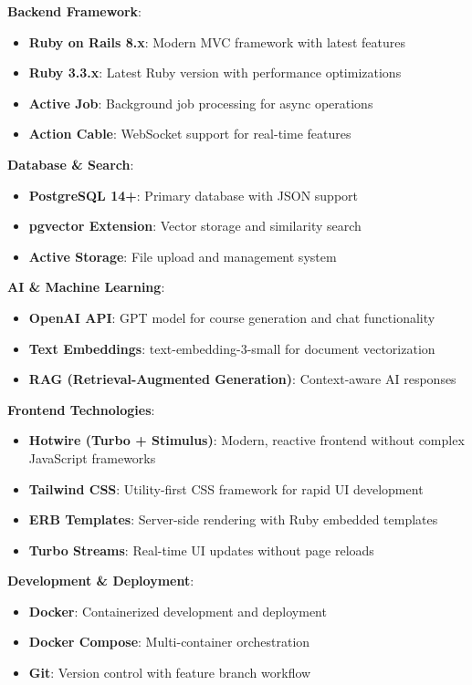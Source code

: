\documentclass[a4paper,11pt]{article}
\begin{document}
\textbf{Backend Framework}:
\begin{itemize}
    \item \textbf{Ruby on Rails 8.x}: Modern MVC framework with latest features
    \item \textbf{Ruby 3.3.x}: Latest Ruby version with performance optimizations
    \item \textbf{Active Job}: Background job processing for async operations
    \item \textbf{Action Cable}: WebSocket support for real-time features
\end{itemize}

\textbf{Database \& Search}:
\begin{itemize}
    \item \textbf{PostgreSQL 14+}: Primary database with JSON support
    \item \textbf{pgvector Extension}: Vector storage and similarity search
    \item \textbf{Active Storage}: File upload and management system
\end{itemize}

\textbf{AI \& Machine Learning}:
\begin{itemize}
    \item \textbf{OpenAI API}: GPT model for course generation and chat functionality
    \item \textbf{Text Embeddings}: text-embedding-3-small for document vectorization
    \item \textbf{RAG (Retrieval-Augmented Generation)}: Context-aware AI responses
\end{itemize}

\textbf{Frontend Technologies}:
\begin{itemize}
    \item \textbf{Hotwire (Turbo + Stimulus)}: Modern, reactive frontend without complex JavaScript frameworks
    \item \textbf{Tailwind CSS}: Utility-first CSS framework for rapid UI development
    \item \textbf{ERB Templates}: Server-side rendering with Ruby embedded templates
    \item \textbf{Turbo Streams}: Real-time UI updates without page reloads
\end{itemize}

\textbf{Development \& Deployment}:
\begin{itemize}
    \item \textbf{Docker}: Containerized development and deployment
    \item \textbf{Docker Compose}: Multi-container orchestration
    \item \textbf{Git}: Version control with feature branch workflow
\end{itemize}
\end{document}
